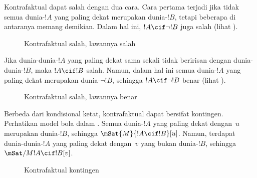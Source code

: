 \documentclass[../../../include/open-logic-section]{subfiles}
\begin{document}
Kontrafaktual dapat salah dengan dua cara. Cara pertama terjadi jika tidak
semua dunia-$!A$ yang paling dekat merupakan dunia-$!B$, tetapi beberapa di
antaranya memang demikian. Dalam hal ini, $!A \cif \lnot !B$ juga salah
(lihat ).
\begin{figure}
\begin{center}
\caption{Kontrafaktual salah, lawannya salah}
\end{center}
\end{figure}
Jika dunia-dunia-$!A$ yang paling dekat sama sekali tidak beririsan dengan
dunia-dunia-$!B$, maka $!A \cif !B$ salah. Namun, dalam hal ini semua
dunia-$!A$ yang paling dekat merupakan dunia-$\lnot !B$, sehingga $!A \cif
\lnot !B$ benar (lihat ).
\begin{figure}
\begin{center}
\caption{Kontrafaktual salah, lawannya benar}
\end{center}
\end{figure}

Berbeda dari kondisional ketat, kontrafaktual dapat bersifat kontingen.
Perhatikan model bola dalam . Semua dunia-$!A$ yang
paling dekat dengan~$u$ merupakan dunia-$!B$, sehingga $\mSat{M}{!A \cif
  !B}[u]$. Namun, terdapat dunia-dunia-$!A$ yang paling dekat dengan~$v$ yang
bukan dunia-$!B$, sehingga $\mSat/{M}{!A \cif !B}[v]$.
\begin{figure}
\begin{center}
\end{center}
\caption{Kontrafaktual kontingen}
\end{figure}
\end{document}
